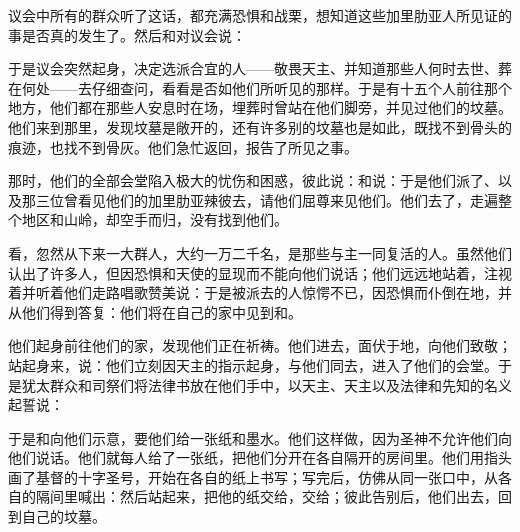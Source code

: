 议会中所有的群众听了这话，都充满恐惧和战栗，想知道这些加里肋亚人所见证的事是否真的发生了。然后和对议会说：\par

于是议会突然起身，决定选派合宜的人——敬畏天主、并知道那些人何时去世、葬在何处——去仔细查问，看看是否如他们所听见的那样。于是有十五个人前往那个地方，他们都在那些人安息时在场，埋葬时曾站在他们脚旁，并见过他们的坟墓。他们来到那里，发现坟墓是敞开的，还有许多别的坟墓也是如此，既找不到骨头的痕迹，也找不到骨灰。他们急忙返回，报告了所见之事。\par

那时，他们的全部会堂陷入极大的忧伤和困惑，彼此说：和说：于是他们派了、以及那三位曾看见他们的加里肋亚辣彼去，请他们屈尊来见他们。他们去了，走遍整个地区和山岭，却空手而归，没有找到他们。\par

看，忽然从下来一大群人，大约一万二千名，是那些与主一同复活的人。虽然他们认出了许多人，但因恐惧和天使的显现而不能向他们说话；他们远远地站着，注视着并听着他们走路唱歌赞美说：于是被派去的人惊愕不已，因恐惧而仆倒在地，并从他们得到答复：他们将在自己的家中见到和。\par

他们起身前往他们的家，发现他们正在祈祷。他们进去，面伏于地，向他们致敬；站起身来，说：他们立刻因天主的指示起身，与他们同去，进入了他们的会堂。于是犹太群众和司祭们将法律书放在他们手中，以天主、天主以及法律和先知的名义起誓说：\par

于是和向他们示意，要他们给一张纸和墨水。他们这样做，因为圣神不允许他们向他们说话。他们就每人给了一张纸，把他们分开在各自隔开的房间里。他们用指头画了基督的十字圣号，开始在各自的纸上书写；写完后，仿佛从同一张口中，从各自的隔间里喊出：然后站起来，把他的纸交给，交给；彼此告别后，他们出去，回到自己的坟墓。\par

